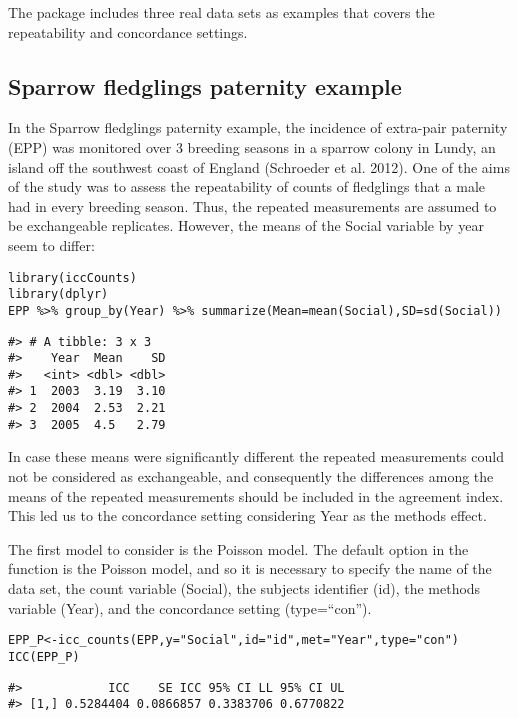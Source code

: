 The package includes three real data sets as examples that covers the repeatability and concordance settings.

\hypertarget{sparrow-fledglings-paternity-example}{%
\subsection{Sparrow fledglings paternity example}\label{sparrow-fledglings-paternity-example}}

In the Sparrow fledglings paternity example, the incidence of extra-pair paternity (EPP) was monitored over 3 breeding seasons in a sparrow colony in Lundy, an island off the southwest coast of England (Schroeder et al. 2012). One of the aims of the study was to assess the repeatability of counts of fledglings that a male had in every breeding season. Thus, the repeated measurements are assumed to be exchangeable replicates. However, the means of the Social variable by year seem to differ:

\begin{verbatim}
library(iccCounts)
library(dplyr)
EPP %>% group_by(Year) %>% summarize(Mean=mean(Social),SD=sd(Social))
\end{verbatim}

\begin{verbatim}
#> # A tibble: 3 x 3
#>    Year  Mean    SD
#>   <int> <dbl> <dbl>
#> 1  2003  3.19  3.10
#> 2  2004  2.53  2.21
#> 3  2005  4.5   2.79
\end{verbatim}

In case these means were significantly different the repeated measurements could not be considered as exchangeable, and consequently the differences among the means of the repeated measurements should be included in the agreement index. This led us to the concordance setting considering Year as the methods effect.

The first model to consider is the Poisson model. The default option in the  function is the Poisson model, and so it is necessary to specify the name of the data set, the count variable (Social), the subjects identifier (id), the methods variable (Year), and the concordance setting (type=``con'').

\begin{verbatim}
EPP_P<-icc_counts(EPP,y="Social",id="id",met="Year",type="con")
ICC(EPP_P)
\end{verbatim}

\begin{verbatim}
#>            ICC    SE ICC 95% CI LL 95% CI UL
#> [1,] 0.5284404 0.0866857 0.3383706 0.6770822
\end{verbatim}

